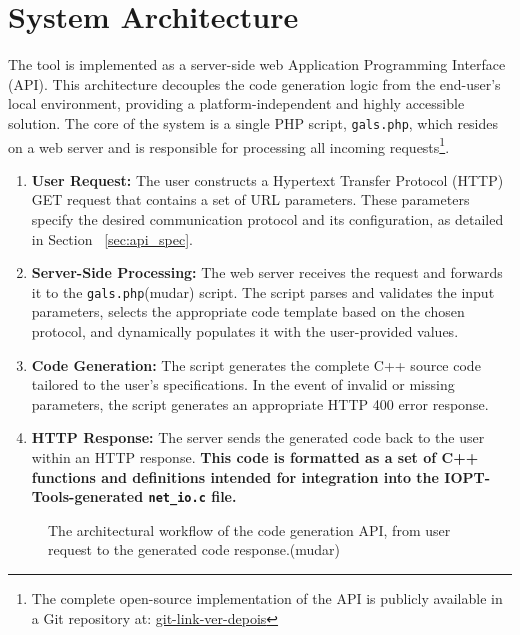 
\section{System Architecture}
\label{sec:design_decisions}


The tool is implemented as a server-side web Application Programming Interface (API). This architecture decouples the code generation logic from the end-user's local environment, providing a platform-independent and highly accessible solution. The core of the system is a single PHP script, \texttt{gals.php}, which resides on a web server and is responsible for processing all incoming requests\footnote{The complete open-source implementation of the API is publicly available in a Git repository at: \url{git-link-ver-depois}}.


\begin{enumerate}
    \item \textbf{User Request:} The user constructs a Hypertext Transfer Protocol (HTTP) GET request that contains a set of URL parameters. These parameters specify the desired communication protocol and its configuration, as detailed in Section ~\ref{sec:api_spec}.
    \item \textbf{Server-Side Processing:} The web server receives the request and forwards it to the \texttt{gals.php}(mudar) script. The script parses and validates the input parameters, selects the appropriate code template based on the chosen protocol, and dynamically populates it with the user-provided values.
    \item \textbf{Code Generation:} The script generates the complete C++ source code tailored to the user's specifications. In the event of invalid or missing parameters, the script generates an appropriate HTTP 400 error response.
    \item \textbf{HTTP Response:} The server sends the generated code back to the user within an HTTP response. \textbf{This code is formatted as a set of C++ functions and definitions intended for integration into the IOPT-Tools-generated \texttt{net\_io.c} file.}
\end{enumerate}

\begin{figure}[h!]
    \centering
    
    \caption{The architectural workflow of the code generation API, from user request to the generated code response.(mudar)}
    \label{fig:api_workflow}
\end{figure}



